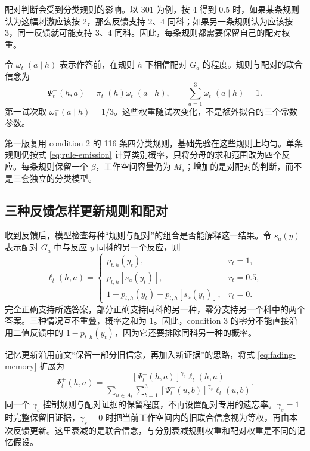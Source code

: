 \documentclass[12pt]{article}
\begin{document}
配对判断会受到分类规则的影响。以 301 为例，按 4 得到 $0.5$ 时，如果某条规则认为这幅刺激应该按 2，那么反馈支持 2、4 同科；如果另一条规则认为应该按 3，同一反馈就可能支持 3、4 同科。因此，每条规则都需要保留自己的配对权重。

令 $\omega_t^{-}(a\mid h)$ 表示作答前，在规则 $h$ 下相信配对 $G_a$ 的程度。规则与配对的联合信念为
\begin{equation}
\Psi_t^{-}(h,a)=\pi_t^{-}(h)\omega_t^{-}(a\mid h),
\qquad
\sum_{a=1}^{3}\omega_t^{-}(a\mid h)=1.
\label{eq:c3-joint-prior}
\end{equation}
第一试次取 $\omega_1^{-}(a\mid h)=1/3$。这些权重随试次变化，不是额外拟合的三个常数参数。

第一版复用 condition 2 的 116 条四分类规则，基础先验在这些规则上均匀。单条规则仍按式 \eqref{eq:rule-emission} 计算类别概率，只将分母的求和范围改为四个反应。每条规则保留一个 $\beta$，工作空间容量仍为 $M_s$；增加的是对配对的判断，而不是三套独立的分类模型。

\subsection{三种反馈怎样更新规则和配对}
\label{sec:condition3-feedback}

收到反馈后，模型检查每种“规则与配对”的组合是否能解释这一结果。令 $s_a(y)$ 表示配对 $G_a$ 中与反应 $y$ 同科的另一个反应，则
\begin{equation}
\ell_t(h,a)=
\begin{cases}
p_{t,h}(y_t),&r_t=1,\\
p_{t,h}[s_a(y_t)],&r_t=0.5,\\
1-p_{t,h}(y_t)-p_{t,h}[s_a(y_t)],&r_t=0.
\end{cases}
\label{eq:c3-feedback-kernel}
\end{equation}
完全正确支持所选答案，部分正确支持同科的另一种，零分支持另一个科中的两个答案。三种情况互不重叠，概率之和为 1。因此，condition 3 的零分不能直接沿用二值反馈中的 $1-p_{t,h}(y_t)$，因为它还要排除同科另一种的概率。

记忆更新沿用前文“保留一部分旧信念，再加入新证据”的思路，将式 \eqref{eq:fading-memory} 扩展为
\begin{equation}
\Psi_t^{+}(h,a)=
\frac{[\Psi_t^{-}(h,a)]^{\gamma_s}\ell_t(h,a)}
{\sum_{u\in A_t}\sum_{b=1}^{3}[\Psi_t^{-}(u,b)]^{\gamma_s}\ell_t(u,b)}.
\label{eq:c3-joint-update}
\end{equation}
同一个 $\gamma_s$ 控制规则与配对证据的保留程度，不再设置配对专用的遗忘率。$\gamma_s=1$ 时完整保留旧证据，$\gamma_s=0$ 时把当前工作空间内的旧联合信念视为等权，再由本次反馈更新。这里衰减的是联合信念，与分别衰减规则权重和配对权重是不同的记忆假设。
\end{document}
